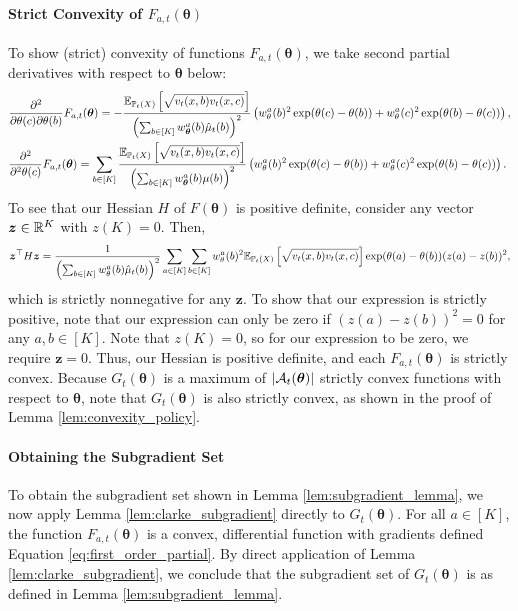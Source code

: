 \documentclass{article}
\begin{document}
\begin{appendices}
\paragraph{Strict Convexity of $F_{a,t}(\bm{\theta})$} To show (strict) convexity of functions $F_{a,t}(\bm{\theta})$, we take second partial derivatives with respect to $\bm{\theta}$ below:
\begin{align}
    &\frac{\partial^2}{\partial \theta(c)\partial\theta(b)} F_{a,t}(\boldsymbol{\theta}) = -\frac{\mathbb{E}_{\mathbb{P}_t(X)}\left[\sqrt{v_t(x,b)v_t(x,c)} \right]}{\left(\sum_{b \in [K]} w_{\boldsymbol{\theta}}^a(b) \hat\mu_t(b)\right)^2} \left(  w_\theta^a(b)^2\exp(\theta(c) - \theta(b)) + w_\theta^a(c)^2 \exp(\theta(b)-\theta(c))\right),\\
    & \frac{\partial^2}{\partial^2 \theta(c)} F_{a,t}(\boldsymbol{\theta}) = \sum_{b \in [K]}\frac{\mathbb{E}_{\mathbb{P}_t(X)}\left[\sqrt{v_t(x,b)v_t(x,c)} \right]}{\left(\sum_{b \in [K]} w_{\boldsymbol{\theta}}^a(b) \mu(b)\right)^2} \left(  w_\theta^a(b)^2\exp(\theta(c) - \theta(b)) + w_\theta^a(c)^2 \exp(\theta(b)-\theta(c))\right).
\end{align}
To see that our Hessian $H$ of $F(\bm\theta)$ is positive definite, consider any vector $\boldsymbol{z} \in \mathbb{R}^K$ with $z(K) = 0$. Then, 
\begin{equation}
    \boldsymbol{z}^\top H \boldsymbol{z} = \frac{1}{\left(\sum_{b \in [K]} w_\theta^a(b)\hat\mu_t(b) \right)^2}\sum_{a \in [K]}\sum_{b \in [K]} w_\theta^a(b)^2\mathbb{E}_{\mathbb{P}_t(X)}\left[\sqrt{v_t(x,b)v_t(x,c)} \right]\exp(\theta(a) - \theta(b))(z(a) - z(b))^2,
\end{equation}
which is strictly nonnegative for any $\bm{z}$. To show that our expression is strictly positive, note that our expression can only be zero if $(z(a) - z(b))^2 = 0$ for any $a, b \in [K]$. Note that $z(K) = 0$, so for our expression to be zero, we require $\bm{z} = 0$. Thus, our Hessian is positive definite, and each $F_{a,t}(\bm{\theta})$ is strictly convex. Because $G_t(\bm{\theta})$ is a maximum of $|\mathcal{A}_t(\boldsymbol{\theta})|$ strictly convex functions with respect to $\bm{\theta}$, note that $G_t(\bm{\theta})$ is also strictly convex, as shown in the proof of Lemma \ref{lem:convexity_policy}. 


\paragraph{Obtaining the Subgradient Set} To obtain the subgradient set shown in Lemma \ref{lem:subgradient_lemma}, we now apply Lemma \ref{lem:clarke_subgradient} directly to $G_t(\bm{\theta})$. For all $a \in [K]$, the function $F_{a,t}(\bm{\theta})$ is a convex, differential function with gradients defined Equation \eqref{eq:first_order_partial}. By direct application of Lemma \ref{lem:clarke_subgradient}, we conclude that the subgradient set of $G_t(\bm{\theta})$ is as defined in Lemma \ref{lem:subgradient_lemma}. 



\end{appendices}
\end{document}
